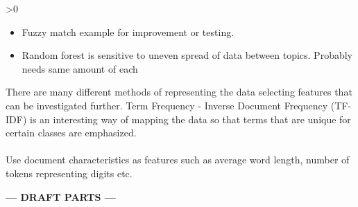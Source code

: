 \ifnum\printdraft>0
	\begin{itemize}
		\item Fuzzy match example for improvement or testing.
		\item Random forest is sensitive to uneven spread of data between topics. Probably needs same amount of each
	\end{itemize}
	There are many different methods of representing the data selecting features that can be investigated further. Term Frequency - Inverse Document Frequency (TF-IDF) is an interesting way of mapping the data so that terms that are unique for certain classes are emphasized.\\\\
	Use document characteristics as features such as average word length, number of tokens representing digits etc.
\else
\begin{center}
	\textbf{--- DRAFT PARTS ---}
\end{center}
\fi
